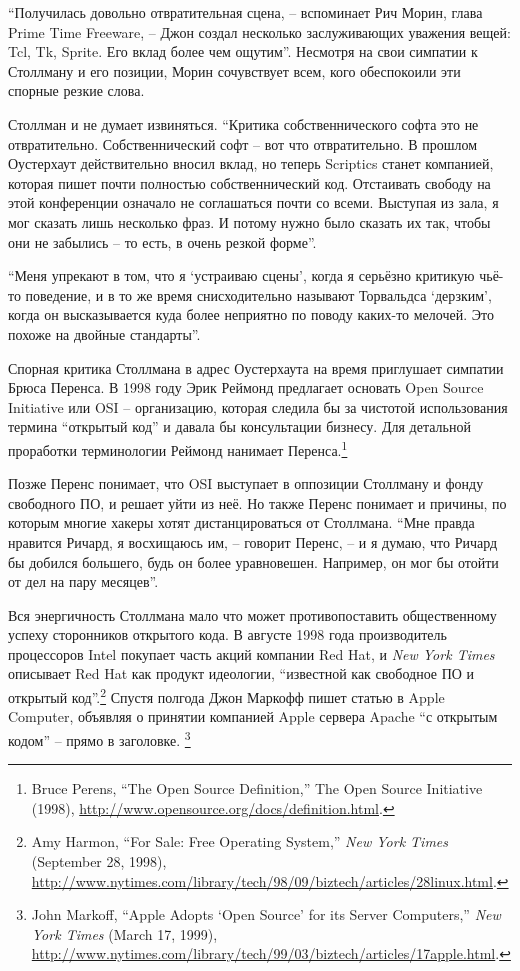 \enquote{Получилась довольно отвратительная сцена, -- вспоминает Рич Морин, глава Prime Time Freeware, -- Джон создал несколько заслуживающих уважения вещей: Tcl, Tk, Sprite. Его вклад более чем ощутим}. Несмотря на свои симпатии к Столлману и его позиции, Морин сочувствует всем, кого обеспокоили эти спорные резкие слова.

Столлман и не думает извиняться. \enquote{Критика собственнического софта это не отвратительно. Собственнический софт -- вот что отвратительно. В прошлом Оустерхаут действительно вносил вклад, но теперь Scriptics станет компанией, которая пишет почти полностью собственнический код. Отстаивать свободу на этой конференции означало не соглашаться почти со всеми. Выступая из зала, я мог сказать лишь несколько фраз. И потому нужно было сказать их так, чтобы они не забылись -- то есть, в очень резкой форме}.

\enquote{Меня упрекают в том, что я \enquote{устраиваю сцены}, когда я серьёзно критикую чьё-то поведение, и в то же время снисходительно называют Торвальдса \enquote{дерзким}, когда он высказывается куда более неприятно по поводу каких-то мелочей. Это похоже на двойные стандарты}.

Спорная критика Столлмана в адрес Оустерхаута на время приглушает симпатии Брюса Перенса. В 1998 году Эрик Реймонд предлагает основать Open Source Initiative или OSI -- организацию, которая следила бы за чистотой использования термина \enquote{открытый код} и давала бы консультации бизнесу. Для детальной проработки терминологии Реймонд нанимает Перенса.\footnote{Bruce Perens, \enquote{The Open Source Definition,} The Open Source Initiative (1998), \url{http://www.opensource.org/docs/definition.html}.}

Позже Перенс понимает, что OSI выступает в оппозиции Столлману и фонду свободного ПО, и решает уйти из неё. Но также Перенс понимает и причины, по которым многие хакеры хотят дистанцироваться от Столлмана. \enquote{Мне правда нравится Ричард, я восхищаюсь им, -- говорит Перенс, -- и я думаю, что Ричард бы добился большего, будь он более уравновешен. Например, он мог бы отойти от дел на пару месяцев}.

Вся энергичность Столлмана мало что может противопоставить общественному успеху сторонников открытого кода. В августе 1998 года производитель процессоров Intel покупает часть акций компании Red Hat, и \textit{New York Times} описывает Red Hat как продукт идеологии, \enquote{известной как свободное ПО и открытый код}.\footnote{Amy Harmon, \enquote{For Sale: Free Operating System,} \textit{New York Times} (September 28, 1998), \url{http://www.nytimes.com/library/tech/98/09/biztech/articles/28linux.html}.} Спустя полгода Джон Маркофф пишет статью в Apple Computer, объявляя о принятии компанией Apple сервера Apache \enquote{с открытым кодом} -- прямо в заголовке. \footnote{John Markoff, \enquote{Apple Adopts \enquote{Open Source} for its Server Computers,} \textit{New York Times} (March 17, 1999), \url{http://www.nytimes.com/library/tech/99/03/biztech/articles/17apple.html}.}

